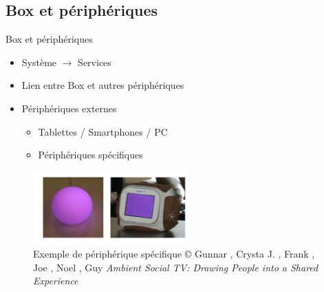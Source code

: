 \documentclass{beamer}
\begin{document}
	\subsection{Box et périphériques}
	\begin{frame}{Box et périphériques}
		\begin{itemize}
			\item Système $\rightarrow$ Services
		\pause
			\item Lien entre Box et autres périphériques
		\pause
			\item Périphériques externes
				\begin{itemize}
					\item Tablettes / Smartphones / PC
					\item Périphériques spécifiques
				\end{itemize}
		\end{itemize}
						\begin{figure}[H]
							\centering
							\includegraphics[width=6cm]{images/otherDevice.png}
							\caption{Exemple de périphérique
							spécifique\newline
							\tiny © Gunnar , Crysta J.  , Frank , Joe , Noel , Guy
							\newline
							\textit{Ambient Social TV: Drawing People into a Shared Experience}
							}
						\end{figure}
	\end{frame}
\end{document}
